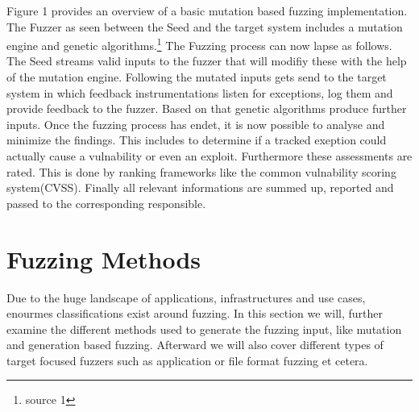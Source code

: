 \documentclass[journal=tosc,final]{iacrtrans}
\begin{document}
\noindent Figure 1 provides an overview of a basic mutation based fuzzing implementation. The Fuzzer as seen between the Seed and the target system includes a mutation engine and genetic algorithms.\footnote{source 1} The Fuzzing process can now lapse as follows.\\
The Seed streams valid inputs to the fuzzer that will modifiy these with the help of the mutation engine. Following the mutated inputs gets send to the target system in which feedback instrumentations listen for exceptions, log them and provide feedback to the fuzzer. Based on that genetic algorithms produce further inputs. Once the fuzzing process has endet, it is now possible to analyse and minimize the findings. This includes to determine if a tracked exeption could actually cause a vulnability or even an exploit. Furthermore these assessments are rated. This is done by ranking frameworks like the common vulnability scoring system(CVSS). Finally all relevant informations are summed up, reported and passed to the corresponding responsible. 


\section{Fuzzing Methods}
Due to the huge landscape of applications, infrastructures and use cases, enourmes classifications exist around fuzzing. In this section we will, further examine the different methods used to generate the fuzzing input, like mutation and generation based fuzzing. Afterward we will also cover different types of target focused fuzzers such as application or file format fuzzing et cetera. 
\end{document}
